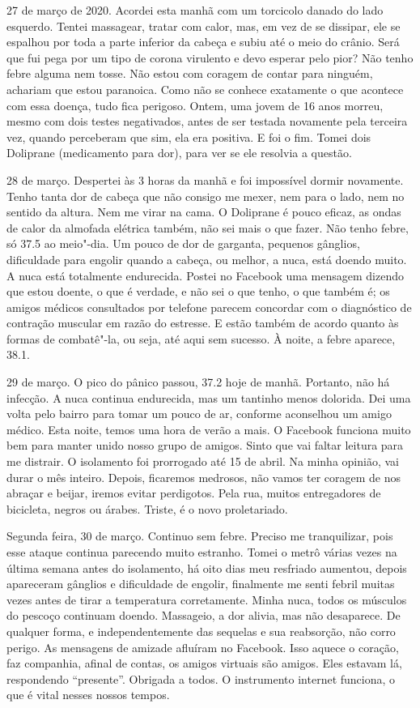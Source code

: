 27 de março de 2020. Acordei esta manhã com um torcicolo danado do lado
esquerdo. Tentei massagear, tratar com calor, mas, em vez de se
dissipar, ele se espalhou por toda a parte inferior da cabeça e subiu
até o meio do crânio. Será que fui pega por um tipo de corona virulento
e devo esperar pelo pior? Não tenho febre alguma nem tosse. Não estou
com coragem de contar para ninguém, achariam que estou paranoica. Como
não se conhece exatamente o que acontece com essa doença, tudo fica
perigoso. Ontem, uma jovem de 16 anos morreu, mesmo com dois testes
negativados, antes de ser testada novamente pela terceira vez, quando
perceberam que sim, ela era positiva. E foi o fim. Tomei dois Doliprane
(medicamento para dor), para ver se ele resolvia a questão.

28 de março. Despertei às 3 horas da manhã e foi impossível dormir
novamente. Tenho tanta dor de cabeça que não consigo me mexer, nem para
o lado, nem no sentido da altura. Nem me virar na cama. O Doliprane é
pouco eficaz, as ondas de calor da almofada elétrica também, não sei
mais o que fazer. Não tenho febre, só 37.5 ao meio"-dia. Um pouco de dor
de garganta, pequenos gânglios, dificuldade para engolir quando a
cabeça, ou melhor, a nuca, está doendo muito. A nuca está totalmente
endurecida. Postei no Facebook uma mensagem dizendo que estou doente, o
que é verdade, e não sei o que tenho, o que também é; os amigos médicos
consultados por telefone parecem concordar com o diagnóstico de
contração muscular em razão do estresse. E estão também de acordo quanto
às formas de combatê"-la, ou seja, até aqui sem sucesso. À noite, a febre
aparece, 38.1.

29 de março. O pico do pânico passou, 37.2 hoje de manhã. Portanto, não
há infecção. A nuca continua endurecida, mas um tantinho menos dolorida.
Dei uma volta pelo bairro para tomar um pouco de ar, conforme aconselhou
um amigo médico. Esta noite, temos uma hora de verão a mais. O Facebook
funciona muito bem para manter unido nosso grupo de amigos. Sinto que
vai faltar leitura para me distrair. O isolamento foi prorrogado até 15
de abril. Na minha opinião, vai durar o mês inteiro. Depois, ficaremos
medrosos, não vamos ter coragem de nos abraçar e beijar, iremos evitar
perdigotos. Pela rua, muitos entregadores de bicicleta, negros ou
árabes. Triste, é o novo proletariado.

Segunda feira, 30 de março. Continuo sem febre. Preciso me tranquilizar,
pois esse ataque continua parecendo muito estranho. Tomei o metrô várias
vezes na última semana antes do isolamento, há oito dias meu resfriado
aumentou, depois apareceram gânglios e dificuldade de engolir,
finalmente me senti febril muitas vezes antes de tirar a temperatura
corretamente. Minha nuca, todos os músculos do pescoço continuam doendo.
Massageio, a dor alivia, mas não desaparece. De qualquer forma, e
independentemente das sequelas e sua reabsorção, não corro perigo. As
mensagens de amizade afluíram no Facebook. Isso aquece o coração, faz
companhia, afinal de contas, os amigos virtuais são amigos. Eles estavam
lá, respondendo ``presente''. Obrigada a todos. O instrumento internet
funciona, o que é vital nesses nossos tempos.

